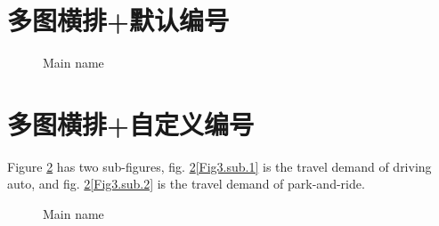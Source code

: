 \documentclass[
	draftmark = false,   %
	fontsetup = font-setup-open.tex,
	titlesetup = titles-setup.tex
]{AJbook}
\numberwithin{equation}{section}
\begin{document}
	\section{多图横排+默认编号}
	\begin{figure}[H]
	\centering  %
	\caption{Main name}
	\label{Fig.main2}
	\end{figure}

	\section{多图横排+自定义编号}
	Figure \ref{Fig.main3} has two sub-figures, fig. \ref{Fig.main3}\ref{Fig3.sub.1} is the travel demand of driving auto, and fig. \ref{Fig.main3}\ref{Fig3.sub.2} is the travel demand of park-and-ride.
	\begin{figure}[H]
	\centering  %
	\caption{Main name}
	\label{Fig.main3}
	\end{figure}
\end{document}
